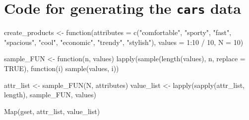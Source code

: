 \documentclass[article]{jss}
\begin{document}
\section[Code for generating the cars data]{Code for generating the \texttt{cars} data}
\label{sec:productcode}

\begin{Sinput}
create_products <-
function(attributes = c("comfortable", "sporty", "fast", "spacious",
         "cool", "economic", "trendy", "stylish"),
         values = 1:10 / 10,
         N = 10)
{
    sample_FUN <- function(n, values)
        lapply(sample(length(values), n, replace = TRUE),
               function(i) sample(values, i))

    attr_list <- sample_FUN(N, attributes)
    value_list <- lapply(sapply(attr_list, length), sample_FUN, values)

    Map(gset, attr_list, value_list)
}
\end{Sinput}


\end{document}
